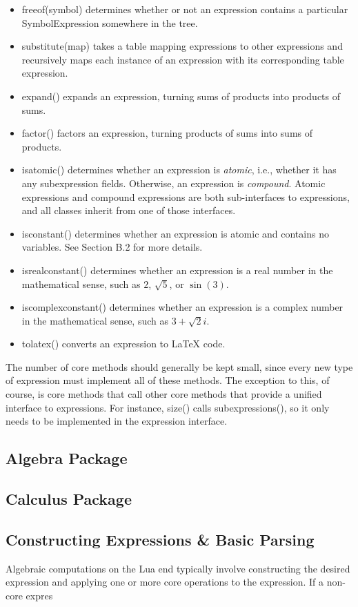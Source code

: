 \documentclass{article}
\begin{document}
\begin{itemize}
    \item {\ttfamily freeof(symbol)} determines whether or not an expression contains a particular \\ {\ttfamily SymbolExpression} somewhere in the tree.
    
    \item {\ttfamily substitute(map)} takes a table mapping expressions to other expressions and recursively maps each instance of an expression with its corresponding table expression.
    
    \item {\ttfamily expand()} expands an expression, turning sums of products into products of sums.
    
    \item {\ttfamily factor()} factors an expression, turning products of sums into sums of products.
    
    \item {\ttfamily isatomic()} determines whether an expression is \emph{atomic}, i.e., whether it has any subexpression fields. Otherwise, an expression is \emph{compound}. Atomic expressions and compound expressions are both sub-interfaces to expressions, and all classes inherit from one of those interfaces.
    
    \item {\ttfamily isconstant()} determines whether an expression is atomic and contains no variables. See Section B.2 for more details.
    
    \item {\ttfamily isrealconstant()} determines whether an expression is a real number in the mathematical sense, such as $2$, $\sqrt{5}$, or $\sin(3)$.
    
    \item {\ttfamily iscomplexconstant()} determines whether an expression is a complex number in the mathematical sense, such as $3 + \sqrt{2}i$.
    
    \item {\ttfamily tolatex()} converts an expression to \LaTeX{} code.
\end{itemize}

The number of core methods should generally be kept small, since every new type of expression must implement all of these methods. The exception to this, of course, is core methods that call other core methods that provide a unified interface to expressions. For instance, {\ttfamily size()} calls {\ttfamily subexpressions()}, so it only needs to be implemented in the expression interface.

\subsection{Algebra Package}

\subsection{Calculus Package}

\subsection{Constructing Expressions \& Basic Parsing}

Algebraic computations on the Lua end typically involve constructing the desired expression and applying one or more core operations to the expression. If a non-core expres
\end{document}
